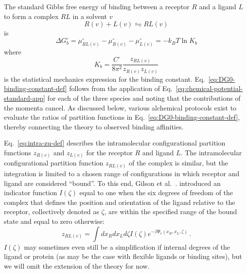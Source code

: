 \documentclass[9pt,bestpractices]{livecoms}
\begin{document}
The standard Gibbs free energy of binding between a receptor $R$ and a ligand $L$ to form a complex $RL$ in a solvent $v$
\begin{equation}
  R(v) + L(v)  \leftrightharpoons RL(v)
  \label{eq:binding-reaction-app}
\end{equation}
is
\begin{equation}
  \Delta G^\circ_{b} = \mu^\circ_{RL(v)}  - \mu^\circ_{R(v)} - \mu^\circ_{L(v)} = -k_B T \ln K_b 
  \label{eq:DG0-binding-def-app}
\end{equation}
where~\cite{gilson1997statisticalthermodynamic,gilson2007calculation}
\begin{equation}
  K_b = \frac{C^\circ}{8 \pi^2} \frac{z_{RL(v)}}{z_{R(v)} z_{L(v)}}
  \label{eq:DG0-binding-constant-def-app}
\end{equation}
is the statistical mechanics expression for the binding constant. Eq.~\ref{eq:DG0-binding-constant-def} follows from the application of  Eq.~\ref{eq:chemical-potential-standard-app} for each of the three species and noting that the contributions of the momenta cancel. As discussed below, various alchemical protocols exist to evaluate the ratios of partition functions in Eq.~\ref{eq:DG0-binding-constant-def}, thereby connecting the theory to observed binding affinities.

Eq.~\ref{eq:intra-zu-def} describes the intramolecular configurational partition functions $z_{R(v)}$ and $z_{L(v)}$ for the receptor $R$ and ligand $L$. The intramolecular configurational partition function $z_{RL(v)}$ of the complex is similar, but the integration is limited to a chosen range of configurations in which receptor and ligand are considered ``bound''. To this end, Gilson et al.~\cite{gilson1997statisticalthermodynamic}. introduced an indicator function $I(\zeta)$ equal to one when the six degrees of freedom of the complex that defines the position and orientation of the ligand relative to the receptor, collectively denoted as $\zeta$, are within the specified range of the bound state and equal to zero otherwise:
\begin{equation}
  z_{RL(v)} = \int dx_R dx_L d\zeta I(\zeta) e^{-\beta \Psi_v(x_R, x_L, \zeta)} \, .
  \label{eq:intra-zRL-def}
\end{equation}
$I(\zeta)$ may sometimes even still be a simplification if internal degrees of the ligand or protein (as may be the case with flexible ligands or binding sites), but we will omit the extension of the theory for now.
\end{document}
